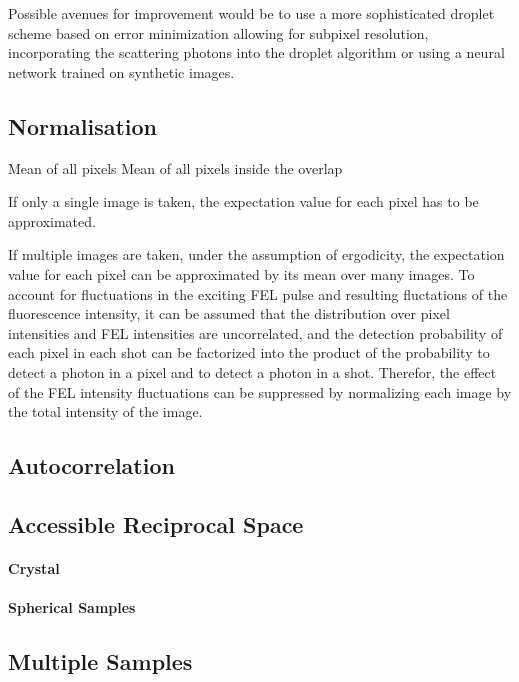 Possible avenues for improvement would be to use a more sophisticated droplet scheme based on error minimization allowing for subpixel resolution, incorporating the scattering photons into the droplet algorithm or using a neural network trained on synthetic images.




\subsection{Normalisation}
Mean of all pixels 
Mean of all pixels inside the overlap

If only a single image is taken, the expectation value for each pixel has to be approximated.

If multiple images are taken, under the assumption of ergodicity, the expectation value for each pixel can be approximated by its mean over many images. To account for fluctuations in the exciting FEL pulse and resulting fluctations of the fluorescence intensity, it can be assumed that the distribution over pixel  intensities and FEL intensities are uncorrelated, and the detection probability of each pixel in each shot can be factorized into the product of the probability to detect a photon in a pixel and to detect a photon in a shot. Therefor, the effect of the FEL intensity fluctuations can be suppressed by normalizing each image by the total intensity of the image.



\subsection{Autocorrelation}

\subsection{Accessible Reciprocal Space}
	\paragraph{Crystal}
	\paragraph{Spherical Samples}

\subsection{Multiple Samples}





